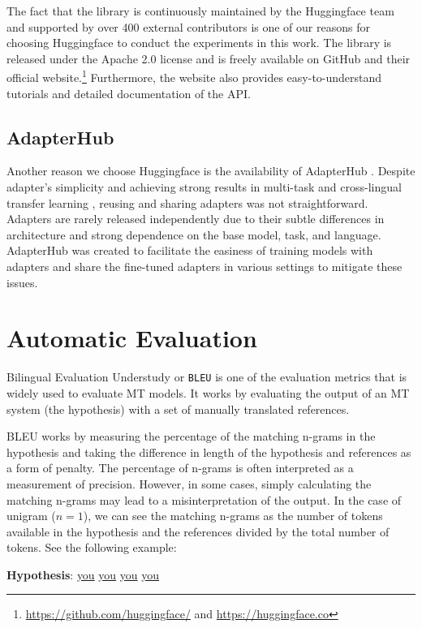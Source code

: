 The fact that the library is continuously maintained by the Huggingface team and supported by over 400 external contributors is one of our reasons for choosing Huggingface to conduct the experiments in this work. The library is released under the Apache 2.0 license and is freely available on GitHub and their official website.\footnote{\url{https://github.com/huggingface/} and \url{https://huggingface.co}} Furthermore, the website also provides easy-to-understand tutorials and detailed documentation of the API.

\subsection{AdapterHub}
Another reason we choose Huggingface is the availability of AdapterHub . Despite adapter's simplicity and achieving strong results in multi-task and cross-lingual transfer learning , reusing and sharing adapters was not straightforward. Adapters are rarely released independently due to their subtle differences in architecture and strong dependence on the base model, task, and language. AdapterHub was created to facilitate the easiness of training models with adapters and share the fine-tuned adapters in various settings to mitigate these issues.

\section{Automatic Evaluation}
\label{sec:aeval}
Bilingual Evaluation Understudy or \texttt{BLEU}  is one of the evaluation metrics that is widely used to evaluate MT models. It works by evaluating the output of an MT system (the hypothesis) with a set of manually translated references.

BLEU works by measuring the percentage of the matching n-grams in the hypothesis and taking the difference in length of the hypothesis and references as a form of penalty. The percentage of n-grams is often interpreted as a measurement of precision. However, in some cases, simply calculating the matching n-grams may lead to a misinterpretation of the output. In the case of unigram ($n=1$), we can see the matching n-grams as the number of tokens available in the hypothesis and the references divided by the total number of tokens. See the following example:

\bigskip

\textbf{Hypothesis}: \underline{you} \underline{you} \underline{you} \underline{you}

